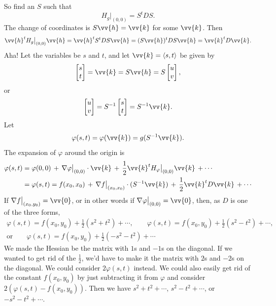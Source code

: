 \documentclass[12pt]{article}
\begin{document}
So find an $S$ such that
\[
H_g\big|_{(0,0)} = S^t D S .
\]
The change of coordinates is
$S \vv{h} = \vv{k}$ for some $\vv{k}$.   Then
\[
\vv{h}^t H_g\big|_{(0,0)} \vv{h}
=
\vv{h}^t S^t D S \vv{h}
=
(S\vv{h})^t D S \vv{h}
=
\vv{k}^t D \vv{k} .
\]
Aha!  Let the variables be $s$ and $t$, and let
$\vv{k} = \langle s,t \rangle$ be given by
\[
\begin{bmatrix} s \\ t \end{bmatrix}
=
\vv{k} =
S \vv{h} 
=
S
\begin{bmatrix} u \\ v \end{bmatrix} ,
\]
or
\[
\begin{bmatrix} u \\ v \end{bmatrix}
=
S^{-1}
\begin{bmatrix} s \\ t \end{bmatrix} 
=
S^{-1} \vv{k} .
\]
Let
\[
\varphi(s,t) = \varphi(\vv{k}) = g(S^{-1}\vv{k}) .
\]
The expansion of $\varphi$ around the origin
is
\[
\begin{split}
\varphi(s,t) & = \varphi(0,0) \, + \,
\nabla \varphi\big|_{(0,0)} \cdot \vv{k}
\, + \,
\frac{1}{2} \vv{k}^{t} H_\varphi\big|_{(0,0)} \vv{k} \,
+ \cdots
\\
& =
\varphi(s,t) = f(x_0,x_0) \, + \,
\nabla f\big|_{(x_0,x_0)} \cdot (S^{-1} \vv{k})
\, + \,
\frac{1}{2} \vv{k}^{t} D \vv{k} \,
+ \cdots
\end{split}
\]
If $\nabla f\big|_{(x_0,y_0)} = \vv{0}$, or in other words if $\nabla
\varphi\big|_{(0,0)} = \vv{0}$, then, as $D$
is one of the three forms,
\begin{multline*}
\varphi(s,t) = f(x_0,y_0) + \frac{1}{2} ( s^2+t^2 ) + \cdots, \qquad
\varphi(s,t) = f(x_0,y_0) + \frac{1}{2} ( s^2-t^2 ) + \cdots, \\
\text{or} \qquad
\varphi(s,t) = f(x_0,y_0) + \frac{1}{2} ( -s^2-t^2 ) + \cdots
\end{multline*}
We made the Hessian be the matrix with $1$s and $-1$s on the diagonal.
If we wanted
to get rid of the $\frac{1}{2}$, we'd have to make it the matrix with $2$s
and $-2$s on the diagonal.
We could consider $2\varphi(s,t)$ instead.
We could also easily get rid of the constant $f(x_0,y_0)$ by just
subtracting it from $\varphi$ and consider $2(\varphi(s,t) - f(x_0,y_0))$.
Then we have $s^2+t^2 + \cdots$,
$s^2-t^2 + \cdots$, or
$-s^2-t^2 + \cdots$.
\end{document}
